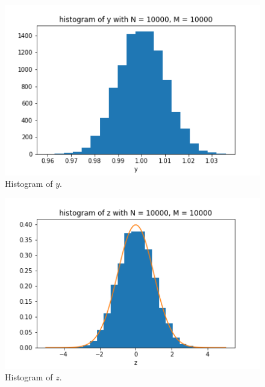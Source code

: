 \documentclass[11pt]{article}
\begin{document}
\begin{figure}[H]
    \centering
    \includegraphics[scale = 0.8]{images/ps-3-4-yhist.png}
    \caption{Histogram of $y$.}
    \label{yhist}
\end{figure}

\begin{figure}[H]
    \centering
    \includegraphics[scale = 0.8]{images/ps-3-4-zhist.png}
    \caption{Histogram of $z$.}
    \label{zhist}
\end{figure}
\end{document}
